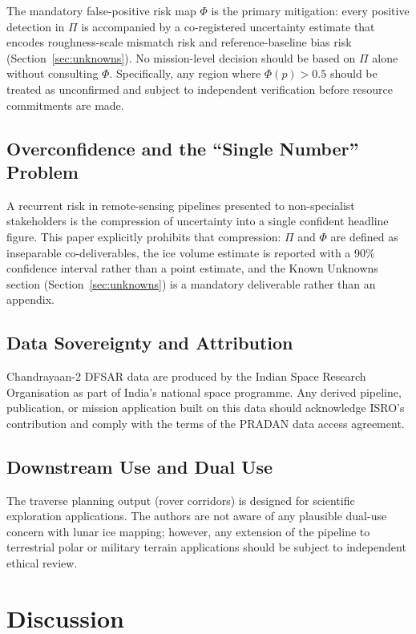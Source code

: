 \documentclass[10pt,conference]{IEEEtran}
\begin{document}
The mandatory false-positive risk map $\Phi$ is the primary
mitigation: every positive detection in $\Pi$ is accompanied by a
co-registered uncertainty estimate that encodes roughness-scale
mismatch risk and reference-baseline bias risk
(Section~\ref{sec:unknowns}).
No mission-level decision should be based on $\Pi$ alone without
consulting $\Phi$.
Specifically, any region where $\Phi(p) > 0.5$ should be treated
as unconfirmed and subject to independent verification before
resource commitments are made.

\subsection{Overconfidence and the ``Single Number'' Problem}
A recurrent risk in remote-sensing pipelines presented to
non-specialist stakeholders is the compression of uncertainty
into a single confident headline figure.
This paper explicitly prohibits that compression:
$\Pi$ and $\Phi$ are defined as inseparable co-deliverables,
the ice volume estimate is reported with a 90\% confidence interval
rather than a point estimate, and the Known Unknowns section
(Section~\ref{sec:unknowns}) is a mandatory deliverable rather than
an appendix.

\subsection{Data Sovereignty and Attribution}
Chandrayaan-2 DFSAR data are produced by the Indian Space Research
Organisation as part of India's national space programme.
Any derived pipeline, publication, or mission application built on
this data should acknowledge ISRO's contribution and comply with
the terms of the PRADAN data access agreement.

\subsection{Downstream Use and Dual Use}
The traverse planning output (rover corridors) is designed for
scientific exploration applications.
The authors are not aware of any plausible dual-use concern with
lunar ice mapping; however, any extension of the pipeline
to terrestrial polar or military terrain applications should
be subject to independent ethical review.

\section{Discussion}
\label{sec:discussion}
\end{document}
